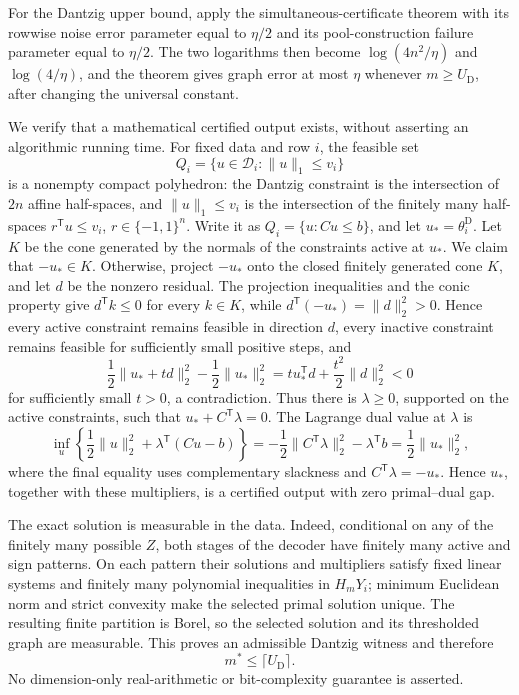For the Dantzig upper bound, apply the simultaneous-certificate theorem with its rowwise noise error parameter equal to \(\eta/2\) and its pool-construction failure parameter equal to \(\eta/2\).  The two logarithms then become \(\log(4n^2/\eta)\) and \(\log(4/\eta)\), and the theorem gives graph error at most \(\eta\) whenever \(m\ge U_{\mathrm D}\), after changing the universal constant.

We verify that a mathematical certified output exists, without asserting an algorithmic running time.  For fixed data and row \(i\), the feasible set
\[
 Q_i=\{u\in\mathcal D_i:\lVert u\rVert_1\le v_i\}
\]
is a nonempty compact polyhedron: the Dantzig constraint is the intersection of \(2n\) affine half-spaces, and \(\lVert u\rVert_1\le v_i\) is the intersection of the finitely many half-spaces \(r^{\mathsf T}u\le v_i\), \(r\in\{-1,1\}^n\).  Write it as \(Q_i=\{u:Cu\le b\}\), and let \(u_* =\theta_i^{\mathrm D}\).  Let \(K\) be the cone generated by the normals of the constraints active at \(u_*\).  We claim that \(-u_*\in K\).  Otherwise, project \(-u_*\) onto the closed finitely generated cone \(K\), and let \(d\) be the nonzero residual.  The projection inequalities and the conic property give \(d^{\mathsf T}k\le0\) for every \(k\in K\), while \(d^{\mathsf T}(-u_*)=\lVert d\rVert_2^2>0\).  Hence every active constraint remains feasible in direction \(d\), every inactive constraint remains feasible for sufficiently small positive steps, and
\[
 \frac12\lVert u_*+td\rVert_2^2-\frac12\lVert u_*\rVert_2^2
 =t u_*^{\mathsf T}d+\frac{t^2}{2}\lVert d\rVert_2^2<0
\]
for sufficiently small \(t>0\), a contradiction.  Thus there is \(\lambda\ge0\), supported on the active constraints, such that \(u_*+C^{\mathsf T}\lambda=0\).  The Lagrange dual value at \(\lambda\) is
\[
 \inf_u\left\{\frac12\lVert u\rVert_2^2+\lambda^{\mathsf T}(Cu-b)\right\}
 =-\frac12\lVert C^{\mathsf T}\lambda\rVert_2^2-\lambda^{\mathsf T}b
 =\frac12\lVert u_*\rVert_2^2,
\]
where the final equality uses complementary slackness and \(C^{\mathsf T}\lambda=-u_*\).  Hence \(u_*\), together with these multipliers, is a certified output with zero primal--dual gap.

The exact solution is measurable in the data.  Indeed, conditional on any of the finitely many possible \(Z\), both stages of the decoder have finitely many active and sign patterns.  On each pattern their solutions and multipliers satisfy fixed linear systems and finitely many polynomial inequalities in \(H_mY_i\); minimum Euclidean norm and strict convexity make the selected primal solution unique.  The resulting finite partition is Borel, so the selected solution and its thresholded graph are measurable.  This proves an admissible Dantzig witness and therefore
\[
 m^*\le\lceil U_{\mathrm D}\rceil.
 \tag{64}
\]
No dimension-only real-arithmetic or bit-complexity guarantee is asserted.

